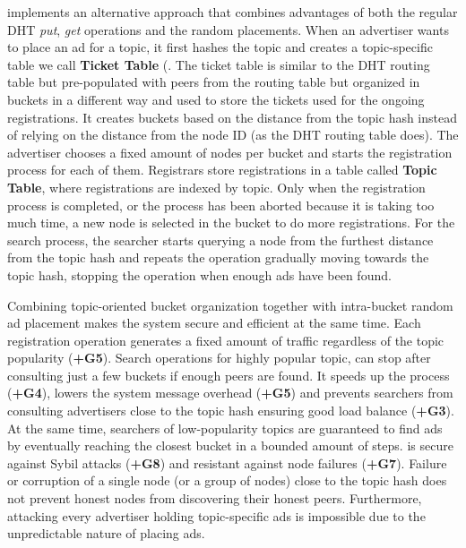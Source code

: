 \sysname implements an alternative approach that combines advantages of both the regular DHT \emph{put}, \emph{get} operations and the random placements. 
When an advertiser wants to place an ad for a topic,  it first hashes the topic and creates a topic-specific table we call \textbf{Ticket Table} (. 
The ticket table is similar to the DHT routing table but pre-populated with peers from the routing table but organized in buckets in a different way and used to store the tickets used for the ongoing registrations.
It creates buckets based on the distance from the topic hash instead of relying on the distance from the node ID (as the DHT routing table does). 
The advertiser chooses a fixed amount of nodes per bucket and starts the registration process for each of them.
Registrars store registrations in a table called \textbf{Topic Table},  where registrations are indexed by topic.
Only when the registration process is completed, or the process has been aborted because it is taking too much time, a new node is selected in the bucket to do more registrations. 
For the search process,  the searcher starts querying  a node from the furthest distance from the topic hash and repeats the operation gradually moving towards the topic hash,  stopping the operation when enough ads have been found.

Combining topic-oriented bucket organization together with intra-bucket random ad placement makes the system secure and efficient at the same time. 
Each registration operation generates a fixed amount of traffic regardless of the topic popularity (\textbf{+G5}). 
Search operations for highly popular topic, can stop after consulting just a few buckets if enough peers are found. 
It speeds up the process (\textbf{+G4}), lowers the system message overhead (\textbf{+G5}) and prevents searchers from consulting advertisers close to the topic hash ensuring good load balance (\textbf{+G3}). 
At the same time, searchers of low-popularity topics are guaranteed to find ads by eventually reaching the closest bucket in a bounded amount of steps. 
\sysname is secure against Sybil attacks (\textbf{+G8}) and resistant against node failures (\textbf{+G7}). Failure or corruption of a single node (or a group of nodes) close to the topic hash does not prevent honest nodes from discovering their honest peers. 
Furthermore, attacking every advertiser holding topic-specific ads is impossible due to the unpredictable nature of placing ads. 



